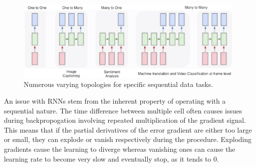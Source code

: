 \documentclass[10pt,onecolumn,letterpaper]{article}
\begin{document}
\begin{figure}[!hbt!]
\centering
\includegraphics[width=14.5cm]{rnn_topologies.png}
\caption{Numerous varying topologies for specific sequential data tasks.}
\end{figure}

An issue with RNNs stem from the inherent property of operating with a sequential nature. The time difference between multiple cell often causes issues during backpropogation involving repeated multiplication of the gradient signal. This means that if the partial derivatives of the error gradient are either too large or small, they can explode or vanish respectively during the procedure. Exploding gradients cause the learning to diverge whereas vanishing ones can cause the learning rate to become very slow and eventually stop, as it tends to 0.
 
\end{document}
